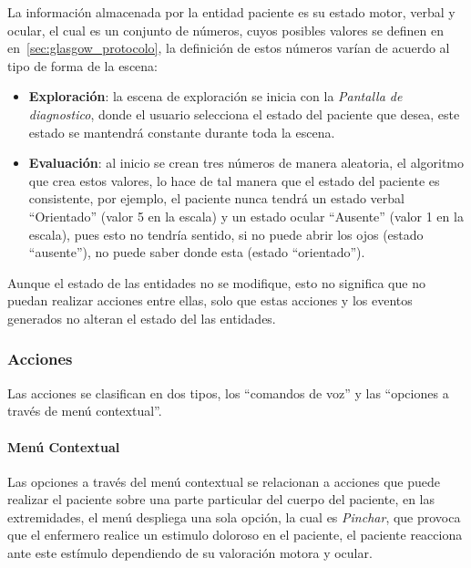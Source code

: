 La información almacenada por la entidad paciente es su estado motor, verbal y
ocular, el cual es un conjunto de números, cuyos posibles valores se definen en
en~\ref{sec:glasgow_protocolo}, la definición de estos números varían de acuerdo
al tipo de forma de la escena:

\begin{itemize}
    \item \textbf{Exploración}: la escena de exploración se inicia con la
        \emph{Pantalla de diagnostico}, donde el usuario selecciona el estado
        del paciente que desea, este estado se mantendrá constante durante toda
        la escena.
    \item \textbf{Evaluación}: al inicio se crean tres números de manera
        aleatoria, el algoritmo que crea estos valores, lo hace de tal manera
        que el estado del paciente es consistente, por ejemplo, el paciente
        nunca tendrá un estado verbal \enquote{Orientado} (valor 5 en la escala)
        y un estado ocular \enquote{Ausente} (valor 1 en la escala), pues esto
        no tendría sentido, si no puede abrir los ojos (estado
        \enquote{ausente}), no puede saber donde esta (estado
        \enquote{orientado}).
\end{itemize}

Aunque el estado de las entidades no se modifique, esto no significa que no
puedan realizar acciones entre ellas, solo que estas acciones y los eventos
generados no alteran el estado del las entidades.

\subsubsection{Acciones} 

Las acciones se clasifican en dos tipos, los \enquote{comandos de voz} y las
\enquote{opciones a través de menú contextual}. 

\paragraph{Menú Contextual}

Las opciones a través del menú contextual se relacionan a acciones que puede
realizar el paciente sobre una parte particular del cuerpo del paciente, en las
extremidades, el menú despliega una sola opción, la cual es \emph{Pinchar}, que
provoca que el enfermero realice un estimulo doloroso en el paciente, el
paciente reacciona ante este estímulo dependiendo de su valoración motora y
ocular. 

